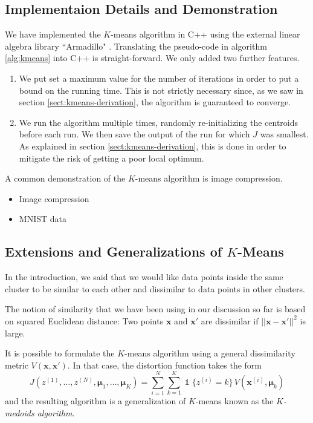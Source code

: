 \documentclass[final,3p,times,twocolumn]{elsarticle}
\let\bs\boldsymbol
\DeclareMathOperator*{\id}{\mathds{1}}
\begin{document}
\subsection{Implementaion Details and Demonstration}
\label{sect:kmeans-code}
We have implemented the $K$-means algorithm in C++ using the external linear algebra library ``Armadillo" \cite{armadillo}.
Translating the pseudo-code in algorithm \ref{alg:kmeans} into C++ is straight-forward.
We only added two further features.
\begin{enumerate}
\item We put set a maximum value for the number of iterations in order to put a bound on the running time.
This is not strictly necessary since, as we saw in section \ref{sect:kmeans-derivation}, the algorithm is guaranteed to converge.
\item We run the algorithm multiple times, randomly re-initializing the centroids before each run.
We then save the output of the run for which $J$ was smallest.
As explained in section \ref{sect:kmeans-derivation}, this is done in order to mitigate the risk of getting a poor local optimum.
\end{enumerate}
A common demonstration of the $K$-means algorithm is image compression.
\begin{itemize}
\item Image compression
\item MNIST data
\end{itemize}



\subsection{Extensions and Generalizations of $K$-Means}
\label{sect:kmeans-concl}
In the introduction, we said that we would like data points inside the same cluster to be similar to each other and dissimilar to data points in other clusters.

The notion of similarity that we have been using in our discussion so far is based on squared Euclidean distance:
Two points $\bs x$ and $\bs x'$ are dissimilar if $||\bs x-\bs x'||^2$ is large.

It is possible to formulate the $K$-means algorithm using a general dissimilarity metric $V(\boldsymbol x, \boldsymbol x')$.
In that case, the distortion function takes the form
\begin{equation}
\label{eqn:kmedoid-distortion}
J(z^{(1)},\dots,z^{(N)},\bs \mu_1,\dots,\bs \mu_K) = \sum_{i=1}^N \sum_{k=1}^K \id\{z^{(i)}=k\}\,V(\bs x^{(i)}, \bs \mu_k)
\end{equation}
and the resulting algorithm is a generalization of $K$-means known as the \emph{$K$-medoids algorithm}.
\end{document}
